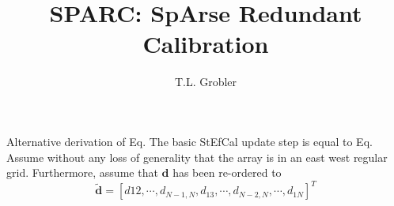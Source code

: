 \documentclass[a4paper,10pt]{article}
\title{SPARC: SpArse Redundant Calibration}
\author{T.L. Grobler}
\begin{document}
\maketitle



\begin{section}{Alternative derivation of Eq.}
The basic StEfCal update step is equal to Eq. %
Assume without any loss of generality that the array is in an east west regular grid. Furthermore, assume that $\boldsymbol{d}$ has been re-ordered to
\begin{equation}
\widetilde{\boldsymbol{d}} = \left[d{12},\cdots,d_{N-1,N},d_{13},\cdots,d_{N-2,N},\cdots,d_{1N}\right]^T 
\end{equation}


\end{section}
\end{document}
